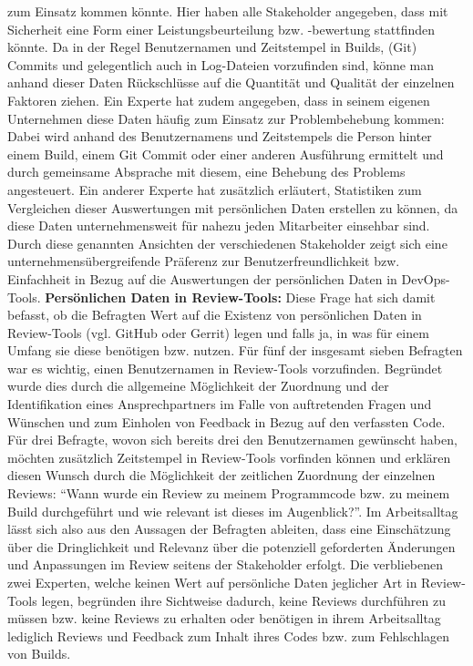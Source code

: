 zum Einsatz kommen könnte. Hier haben alle Stakeholder angegeben, dass mit Sicherheit eine Form einer Leistungsbeurteilung bzw. -bewertung stattfinden könnte. Da in der Regel Benutzernamen und Zeitstempel in Builds, (Git) Commits und gelegentlich auch in Log-Dateien vorzufinden sind, könne man
anhand dieser Daten Rückschlüsse auf die Quantität und Qualität der einzelnen Faktoren ziehen. Ein Experte hat zudem angegeben, dass in seinem eigenen Unternehmen diese Daten häufig zum Einsatz zur Problembehebung kommen: Dabei wird anhand des Benutzernamens und Zeitstempels die Person hinter einem Build,
einem Git Commit oder einer anderen Ausführung ermittelt und durch gemeinsame Absprache mit diesem, eine Behebung des Problems angesteuert. Ein anderer Experte hat zusätzlich erläutert, Statistiken zum Vergleichen dieser Auswertungen mit persönlichen Daten erstellen zu können, da diese Daten unternehmensweit
für nahezu jeden Mitarbeiter einsehbar sind. Durch diese genannten Ansichten der verschiedenen Stakeholder zeigt sich eine unternehmensübergreifende Präferenz zur Benutzerfreundlichkeit bzw. Einfachheit in Bezug auf die Auswertungen der persönlichen Daten in DevOps-Tools. \newline \newline
\textbf{Persönlichen Daten in Review-Tools:} \newline
Diese Frage hat sich damit befasst, ob die Befragten Wert auf die Existenz von persönlichen Daten in Review-Tools (vgl. GitHub oder Gerrit) legen und falls ja, in was für einem Umfang sie diese benötigen bzw. nutzen. Für fünf der insgesamt sieben Befragten war es wichtig, einen Benutzernamen in
Review-Tools vorzufinden. Begründet wurde dies durch die allgemeine Möglichkeit der Zuordnung und der Identifikation eines Ansprechpartners im Falle von auftretenden Fragen und Wünschen und zum Einholen von Feedback in Bezug auf den verfassten Code. Für drei Befragte, wovon sich bereits drei den Benutzernamen
gewünscht haben, möchten zusätzlich Zeitstempel in Review-Tools vorfinden können und erklären diesen Wunsch durch die Möglichkeit der zeitlichen Zuordnung der einzelnen Reviews: \enquote{Wann wurde ein Review zu meinem Programmcode bzw. zu meinem Build durchgeführt und wie relevant ist dieses im Augenblick?}. Im Arbeitsalltag lässt
sich also aus den Aussagen der Befragten ableiten, dass eine Einschätzung über die Dringlichkeit und Relevanz über die potenziell geforderten Änderungen und Anpassungen im Review seitens der Stakeholder erfolgt. \newline
Die verbliebenen zwei Experten, welche keinen Wert auf persönliche Daten jeglicher Art in Review-Tools legen, begründen ihre Sichtweise dadurch, keine Reviews durchführen zu müssen bzw. keine Reviews zu erhalten oder benötigen in ihrem Arbeitsalltag lediglich Reviews und Feedback zum Inhalt ihres Codes bzw. zum Fehlschlagen von Builds. \newline \newline
